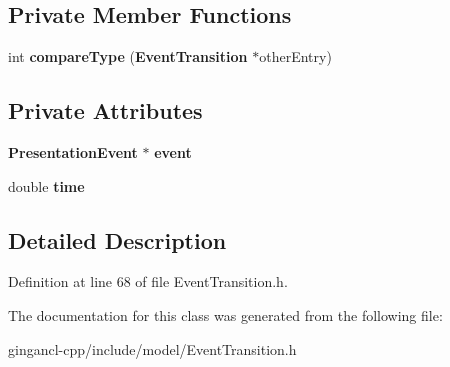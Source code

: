 \subsection*{Private Member Functions}
\begin{CompactItemize}
\item 
int \textbf{compareType} ({\bf EventTransition} $\ast$otherEntry)\label{classbr_1_1pucrio_1_1telemidia_1_1ginga_1_1ncl_1_1model_1_1event_1_1transition_1_1EventTransition_048d6d1cf75193b7b3e561fd3e5dfeac}

\end{CompactItemize}
\subsection*{Private Attributes}
\begin{CompactItemize}
\item 
{\bf PresentationEvent} $\ast$ {\bf event}\label{classbr_1_1pucrio_1_1telemidia_1_1ginga_1_1ncl_1_1model_1_1event_1_1transition_1_1EventTransition_74ff810b539c17d0df646d7d4ad8ceb5}

\item 
double {\bf time}\label{classbr_1_1pucrio_1_1telemidia_1_1ginga_1_1ncl_1_1model_1_1event_1_1transition_1_1EventTransition_b2d5aa7fce1a14d8bddfb2c333ea9679}

\end{CompactItemize}


\subsection{Detailed Description}




Definition at line 68 of file EventTransition.h.

The documentation for this class was generated from the following file:\begin{CompactItemize}
\item 
gingancl-cpp/include/model/EventTransition.h\end{CompactItemize}
